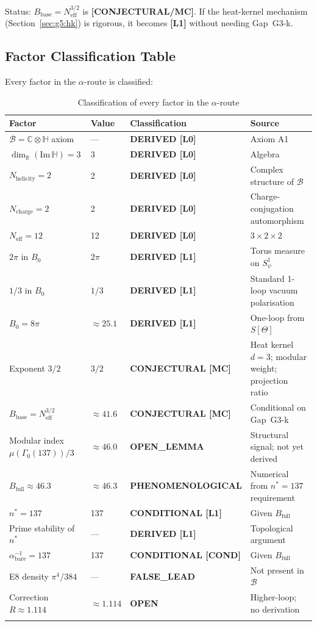 \documentclass[12pt,a4paper]{article}
\theoremstyle{definition}
\theoremstyle{remark}
\begin{document}
\begin{statusbox}
Status: $B_\mathrm{base} = N_\mathrm{eff}^{3/2}$ is \textbf{[CONJECTURAL/MC]}.
If the heat-kernel mechanism (Section~\ref{sec:g5:hk}) is rigorous, it becomes
\textbf{[L1]} without needing Gap~G3-k.
\end{statusbox}

\subsection{Factor Classification Table}

Every factor in the $\alpha$-route is classified:

\begin{longtable}{llll}
\toprule
Factor & Value & Classification & Source \\
\midrule
\endhead
$\mathcal{B} = \mathbb{C}\otimes\mathbb{H}$ axiom & — & \textbf{DERIVED [L0]} & Axiom A1 \\
$\dim_\mathbb{R}(\mathrm{Im}\,\mathbb{H}) = 3$ & 3 & \textbf{DERIVED [L0]} & Algebra \\
$N_\mathrm{helicity} = 2$ & 2 & \textbf{DERIVED [L0]} & Complex structure of $\mathcal{B}$ \\
$N_\mathrm{charge} = 2$ & 2 & \textbf{DERIVED [L0]} & Charge-conjugation automorphism \\
$N_\mathrm{eff} = 12$ & 12 & \textbf{DERIVED [L0]} & $3\times 2\times 2$ \\
$2\pi$ in $B_0$ & $2\pi$ & \textbf{DERIVED [L1]} & Torus measure on $S^1_\psi$ \\
$1/3$ in $B_0$ & $1/3$ & \textbf{DERIVED [L1]} & Standard 1-loop vacuum polarisation \\
$B_0 = 8\pi$ & $\approx 25.1$ & \textbf{DERIVED [L1]} & One-loop from $S[\Theta]$ \\
Exponent $3/2$ & $3/2$ & \textbf{CONJECTURAL [MC]} & Heat kernel $d=3$; modular weight; projection ratio \\
$B_\mathrm{base} = N_\mathrm{eff}^{3/2}$ & $\approx 41.6$ & \textbf{CONJECTURAL [MC]} & Conditional on Gap~G3-k \\
Modular index $\mu(\Gamma_0(137))/3$ & $\approx 46.0$ & \textbf{OPEN\_LEMMA} & Structural signal; not yet derived \\
$B_\mathrm{full} \approx 46.3$ & $\approx 46.3$ & \textbf{PHENOMENOLOGICAL} & Numerical from $n^*=137$ requirement \\
$n^* = 137$ & 137 & \textbf{CONDITIONAL [L1]} & Given $B_\mathrm{full}$ \\
Prime stability of $n^*$ & — & \textbf{DERIVED [L1]} & Topological argument \\
$\alpha^{-1}_\mathrm{bare} = 137$ & 137 & \textbf{CONDITIONAL [COND]} & Given $B_\mathrm{full}$ \\
E8 density $\pi^4/384$ & — & \textbf{FALSE\_LEAD} & Not present in $\mathcal{B}$ \\
Correction $R \approx 1.114$ & $\approx 1.114$ & \textbf{OPEN} & Higher-loop; no derivation \\
\bottomrule
\caption{Classification of every factor in the $\alpha$-route}
\label{tab:g5:factors}
\end{longtable}
\end{document}
